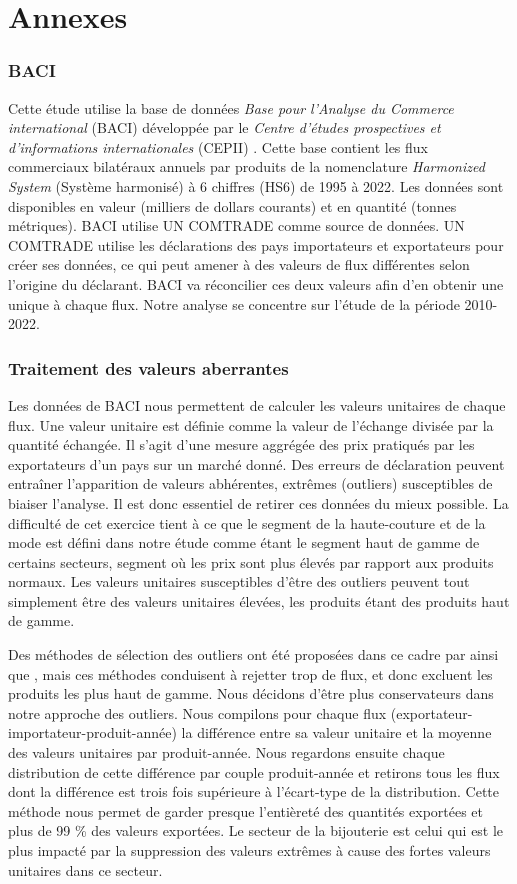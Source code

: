 \documentclass[french,10pt,a4paper]{article}
\newenvironment{annexes}{
    \section*{Annexes}
    \addcontentsline{toc}{section}{Annexes}
    \setstretch{2} %
}{
    \setstretch{1} %
}
\begin{document}
\begin{annexes}
\subsubsection*{BACI}
Cette étude utilise la base de données \textit{Base pour l'Analyse du Commerce international} (BACI) développée par le \textit{Centre d'études prospectives et d'informations internationales} (CEPII) \citep{Gaulier2010}. Cette base contient les flux commerciaux bilatéraux annuels par produits de la nomenclature \textit{Harmonized System} (Système harmonisé) à 6 chiffres (HS6) de 1995 à 2022. Les données sont disponibles en valeur (milliers de dollars courants) et en quantité (tonnes métriques). BACI utilise UN COMTRADE comme source de données. UN COMTRADE utilise les déclarations des pays importateurs et exportateurs pour créer ses données, ce qui peut amener à des valeurs de flux différentes selon l'origine du déclarant. BACI va réconcilier ces deux valeurs afin d'en obtenir une unique à chaque flux. Notre analyse se concentre sur l'étude de la période 2010-2022.

\subsubsection*{Traitement des valeurs aberrantes}
Les données de BACI nous permettent de calculer les valeurs unitaires de chaque flux. Une valeur unitaire est définie comme la valeur de l'échange divisée par la quantité échangée. Il s'agit d'une mesure aggrégée des prix pratiqués par les exportateurs d'un pays sur un marché donné. Des erreurs de déclaration peuvent entraîner l'apparition de valeurs abhérentes, extrêmes (outliers) susceptibles de biaiser l'analyse. Il est donc essentiel de retirer ces données du mieux possible. La difficulté de cet exercice tient à ce que le segment de la haute-couture et de la mode est défini dans notre étude comme étant le segment haut de gamme de certains secteurs, segment où les prix sont plus élevés par rapport aux produits normaux. Les valeurs unitaires susceptibles d'être des outliers peuvent tout simplement être des valeurs unitaires élevées, les produits étant des produits haut de gamme.

Des méthodes de sélection des outliers ont été proposées dans ce cadre par \cite{Hallak2006} ainsi que \cite{Fontagne2013}, mais ces méthodes conduisent à rejetter trop de flux, et donc excluent les produits les plus haut de gamme. Nous décidons d'être plus conservateurs dans notre approche des outliers. Nous compilons pour chaque flux (exportateur-importateur-produit-année) la différence entre sa valeur unitaire et la moyenne des valeurs unitaires par produit-année. Nous regardons ensuite chaque distribution de cette différence par couple produit-année et retirons tous les flux dont la différence est trois fois supérieure à l'écart-type de la distribution. Cette méthode nous permet de garder presque l'entièreté des quantités exportées et plus de 99 \% des valeurs exportées. Le secteur de la bijouterie est celui qui est le plus impacté par la suppression des valeurs extrêmes à cause des fortes valeurs unitaires dans ce secteur.


\end{annexes}
\end{document}
